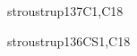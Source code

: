 \begin{syllabus}
\begin{unit}{\PLObjectOrientedProgramming}{}{stroustrup13}{7}{C1,C18}
\begin{learningoutcomes}
	\item \PLObjectOrientedProgrammingLODesignAndClass [\Usage]
	\item \PLObjectOrientedProgrammingLOUseSubclassing [\Usage]
	\item \PLObjectOrientedProgrammingLOCorrectly [\Usage]
	\item \PLObjectOrientedProgrammingLOCompareAndThe [\Usage]
	\item \PLObjectOrientedProgrammingLOExplainTheObject [\Usage] 
	\item \PLObjectOrientedProgrammingLOUseObject [\Usage]
	\item \PLObjectOrientedProgrammingLODefineAndAnd [\Usage]
\end{learningoutcomes}
\end{unit}

\begin{unit}{\SESoftwareDesign}{}{stroustrup13}{6}{CS1,C18}
\begin{topics}
	\item \SESoftwareDesignTopicSystem
	\item \SESoftwareDesignTopicDesign
	\item \SESoftwareDesignTopicStructural
	\item \SESoftwareDesignTopicDesignPatterns
	\item \SESoftwareDesignTopicRelationships
	\item \SESoftwareDesignTopicSoftware
	\item \SESoftwareDesignTopicThe
	\item \SESoftwareDesignTopicInternal
	\item \SESoftwareDesignTopicInternalDesign
	\item \SESoftwareDesignTopicMeasurement
	\item \SESoftwareDesignTopicTradeoffs
	\item \SESoftwareDesignTopicApplication
	\item \SESoftwareDesignTopicMiddleware
	\item \SESoftwareDesignTopicPrinciples
\end{topics}


\end{unit}
\end{syllabus}
